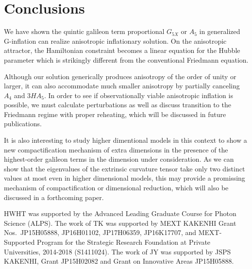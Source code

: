\documentclass[aps,prd,preprint,superscriptaddress,nofootinbib,tightenlines]{revtex4-1}
\begin{document}
\section{Conclusions}\label{conclusion}
We have shown the quintic galileon term proportional $G_{5X}$ or $A_5$ in generalized G-inflation can realize
anisotropic inflationary solution.
On the anisotropic attractor, the Hamiltonian constraint becomes a linear equation for the Hubble parameter
which is strikingly different from the conventional Friedmann equation.

Although our solution generically produces anisotropy of the order of unity or larger,
it can also accommodate much smaller anisotropy
by partially canceling $A_4$ and $3HA_5$.
In order to see if observationally viable anisotropic inflation is possible,
we must calculate perturbations as well as discuss transition to the Friedmann regime with proper reheating,
which will be discussed in future publications.

It is also interesting to study higher dimentional models in this context to show a new compactification mechanism of
extra dimensions in the presence of the highest-order galileon terms in the dimension under consideration.
As we can show that the eigenvalues of the extrinsic curvature tensor take only two distinct values at most
even in higher dimensional models, this may provide a promissing mechanism of compactification or dimensional reduction,
which will also be discussed in a forthcoming paper.


\begin{acknowledgments}
HWHT was supported by the Advanced Leading Graduate Course for Photon Science (ALPS).
  The work of TK was supported by
  MEXT KAKENHI Grant Nos.~JP15H05888, JP16H01102, JP17H06359, JP16K17707,
  and MEXT-Supported Program for the Strategic Research Foundation at Private Universities,
  2014-2018 (S1411024).
The work of JY was supported by JSPS KAKENHI, Grant JP15H02082
and Grant on Innovative Areas JP15H05888.
\end{acknowledgments}


\end{document}
